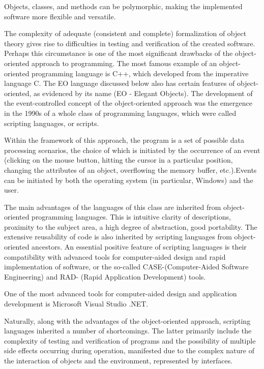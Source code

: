 \documentclass[12pt]{book}
\begin{document}
Objects, classes, and methods can be polymorphic, making the implemented software more flexible and versatile.

The complexity of adequate (consistent and complete) formalization of object theory gives rise to difficulties in testing and verification of the created software. Perhaps this circumstance is one of the most significant drawbacks of the object-oriented approach to programming.
The most famous example of an object-oriented programming language is C++, which developed from the imperative language C. The EO language discussed below also has certain features of object-oriented, as evidenced by its name (EO - Elegant  Objects).
The development of the event-controlled concept of the object-oriented approach was the emergence in the 1990s of a whole class of programming languages, which were called scripting languages, or scripts.

Within the framework of this approach, the program is a set of possible data processing scenarios, the choice of which is initiated by the occurrence of an event (clicking on the mouse button, hitting the cursor in a particular position, changing the attributes of an object, overflowing the memory buffer, etc.).Events can be initiated by both the operating system (in particular, Windows) and the user.

The main advantages of the languages of this class are inherited from object-oriented programming languages. This is intuitive clarity of descriptions, proximity to the subject area, a high degree of abstraction, good portability. The extensive reusability of code is also inherited by scripting languages from object-oriented ancestors.
An essential positive feature of scripting languages is their compatibility with advanced tools for computer-aided design and rapid implementation of software, or the so-called CASE-(Computer-Aided  Software Engineering) and RAD- (Rapid  Application Development) tools.

One of the most advanced tools for computer-aided design and application development is Microsoft Visual Studio .NET.

Naturally, along with the advantages of the object-oriented approach, scripting languages inherited a number of shortcomings. The latter primarily include the complexity of testing and verification of programs and the possibility of multiple side effects occurring during operation, manifested due to the complex nature of the interaction of objects and the environment, represented by interfaces. 
\end{document}
